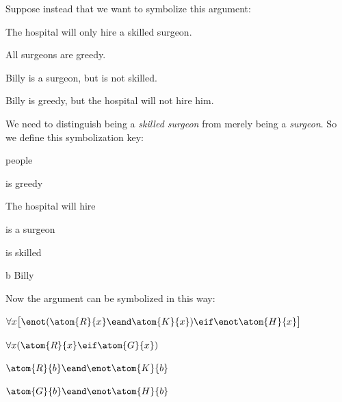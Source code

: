 Suppose instead that we want to symbolize this argument:
\begin{earg}
\item The hospital will only hire a skilled surgeon. 
\item All surgeons are greedy. 
\item Billy is a surgeon, but is not skilled. 
\item[\texttherefore] Billy is greedy, but the hospital will not hire him.
\end{earg}
We need to distinguish being a \emph{skilled surgeon} from merely being a \emph{surgeon}. So we define this symbolization key:
\begin{ekey}
\item[\text{domain}] people
\item[\atom{G}{x}]  is greedy
\item[\atom{H}{x}] The hospital will hire 
\item[\atom{R}{x}]  is a surgeon
\item[\atom{K}{x}]  is skilled
\item[b] Billy
\end{ekey}

Now the argument can be symbolized in this way:
\begin{earg}
\label{surgeon2}
\item[] $\forall x\bigl[\enot (\atom{R}{x} \eand \atom{K}{x}) \eif \enot \atom{H}{x}\bigr]$
\item[] $\forall x(\atom{R}{x} \eif \atom{G}{x})$
\item[] $\atom{R}{b} \eand \enot \atom{K}{b}$
\item[\texttherefore] $\atom{G}{b} \eand \enot \atom{H}{b}$
\end{earg}

